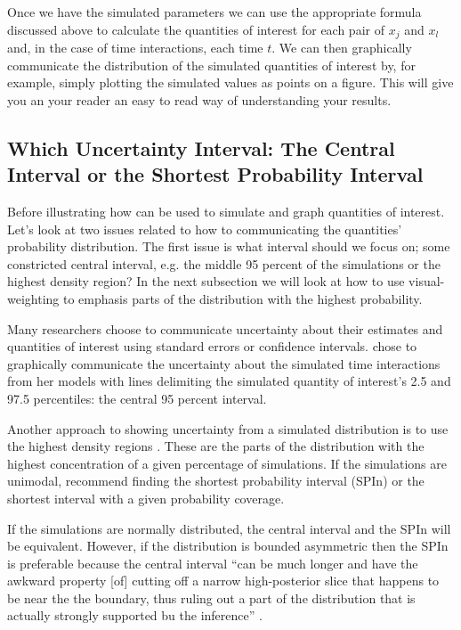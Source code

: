 \documentclass[nojss]{jss}\usepackage{graphicx, color}
\begin{document}
Once we have the simulated parameters we can use the appropriate formula discussed above to calculate the quantities of interest for each pair of $x_{j}$ and $x_{l}$ and, in the case of time interactions, each time $t$. We can then graphically communicate the distribution of the simulated quantities of interest by, for example, simply plotting the simulated values as points on a figure. This will give you an your reader an easy to read way of understanding your results.

\subsection[Which Interval?]{Which Uncertainty Interval: The Central Interval or the Shortest Probability Interval}

Before illustrating how  can be used to simulate and graph quantities of interest. Let's look at two issues related to how to communicating the quantities' probability distribution. The first issue is what interval should we focus on; some constricted central interval, e.g. the middle 95 percent of the simulations or the highest density region? In the next subsection we will look at how to use visual-weighting to emphasis parts of the distribution with the highest probability.

Many researchers choose to communicate uncertainty about their estimates and quantities of interest using standard errors or confidence intervals. \cite{Licht2011} chose to graphically communicate the uncertainty about the simulated time interactions from her models with lines delimiting the simulated quantity of interest's 2.5 and 97.5 percentiles: the central 95 percent interval. 

Another approach to showing uncertainty from a simulated distribution is to use the highest density regions \citep{Box1973,Hyndman1996}. These are the parts of the distribution with the highest concentration of a given percentage of simulations. If the simulations are unimodal, \cite{Liu2013} recommend finding the shortest probability interval (SPIn) or the shortest interval with a given probability coverage.

If the simulations are normally distributed, the central interval and the SPIn will be equivalent. However, if the distribution is bounded asymmetric then the SPIn is preferable because the central interval ``can be much longer and have the awkward property [of] cutting off a narrow high-posterior slice that happens to be near the the boundary, thus ruling out a part of the distribution that is actually strongly supported bu the inference'' \cite[2]{Liu2013}.
\end{document}
